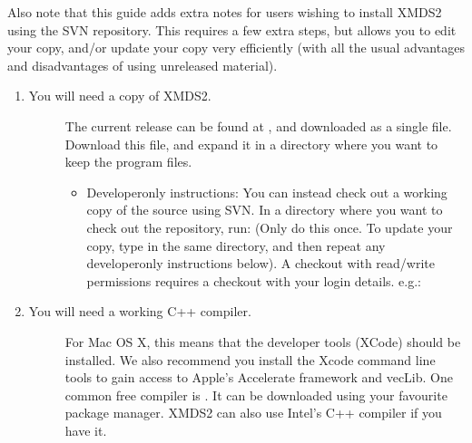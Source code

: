 \documentclass[letterpaper,10pt,english]{sphinxmanual}
\begin{document}
\sphinxAtStartPar
Also note that this guide adds extra notes for users wishing to install XMDS2 using the SVN repository.  This requires a few extra steps, but allows you to edit your copy, and/or update your copy very efficiently (with all the usual advantages and disadvantages of using unreleased material).
\begin{enumerate}
%
\setcounter{enumi}{-1}
\item {} \begin{description}
\item[{You will need a copy of XMDS2.}] \leavevmode
\sphinxAtStartPar
The current release can be found at , and downloaded as a single file.
Download this file, and expand it in a directory where you want to keep the program files.
\begin{itemize}
\item {} 
\sphinxAtStartPar
Developer\sphinxhyphen{}only instructions: You can instead check out a working copy of the source using SVN.
In a directory where you want to check out the repository, run:
(Only do this once.  To update your copy, type  in the same directory, and then repeat any developer\sphinxhyphen{}only instructions below).
A checkout with read/write permissions requires a checkout with your login details.  e.g.:

\end{itemize}

\end{description}

\item {} \begin{description}
\item[{You will need a working C++ compiler.}] \leavevmode
\sphinxAtStartPar
For Mac OS X, this means that the developer tools (XCode) should be installed. We also recommend you install the Xcode command line tools to gain access to Apple’s Accelerate framework and vecLib.
One common free compiler is .  It can be downloaded using your favourite package manager.
XMDS2 can also use Intel’s C++ compiler if you have it.

\end{description}


\end{enumerate}
\end{document}
